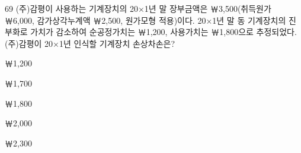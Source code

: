 \begin{question}{69}
(주)감평이 사용하는 기계장치의 20×1년 말 장부금액은 ￦3,500(취득원가 ￦6,000, 감가상각누계액 ￦2,500, 원가모형 적용)이다. 20×1년 말 동 기계장치의 진부화로 가치가 감소하여 순공정가치는 ￦1,200, 사용가치는 ￦1,800으로 추정되었다. (주)감평이 20×1년 인식할 기계장치 손상차손은?
\begin{choices}
  \item ￦1,200
  \item ￦1,700
  \item ￦1,800
  \item ￦2,000
  \item ￦2,300
\end{choices}
\end{question}
